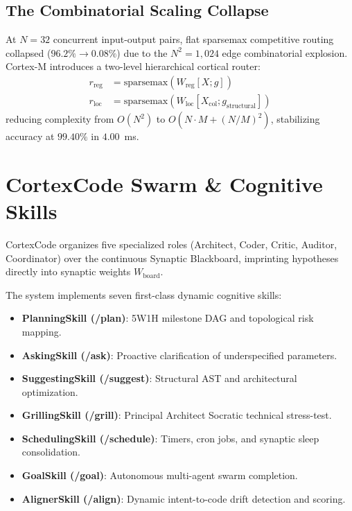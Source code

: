 \documentclass[journal]{IEEEtran}
\begin{document}
\subsection{The Combinatorial Scaling Collapse}
At $N=32$ concurrent input-output pairs, flat sparsemax competitive routing collapsed ($96.2\% \to 0.08\%$) due to the $N^2 = 1,024$ edge combinatorial explosion. Cortex-M introduces a two-level hierarchical cortical router:
\begin{align}
r_{\text{reg}} &= \text{sparsemax}\left(W_{\text{reg}} [X; g]\right) \\
r_{\text{loc}} &= \text{sparsemax}\left(W_{\text{loc}} [X_{\text{col}}; g_{\text{structural}}]\right)
\end{align}
reducing complexity from $O(N^2)$ to $O(N \cdot M + (N/M)^2)$, stabilizing accuracy at $99.40\%$ in $4.00$~ms.

\section{CortexCode Swarm \& Cognitive Skills}
CortexCode organizes five specialized roles (Architect, Coder, Critic, Auditor, Coordinator) over the continuous Synaptic Blackboard, imprinting hypotheses directly into synaptic weights $W_{\text{board}}$. 

The system implements seven first-class dynamic cognitive skills:
\begin{itemize}
    \item \textbf{PlanningSkill (/plan)}: 5W1H milestone DAG and topological risk mapping.
    \item \textbf{AskingSkill (/ask)}: Proactive clarification of underspecified parameters.
    \item \textbf{SuggestingSkill (/suggest)}: Structural AST and architectural optimization.
    \item \textbf{GrillingSkill (/grill)}: Principal Architect Socratic technical stress-test.
    \item \textbf{SchedulingSkill (/schedule)}: Timers, cron jobs, and synaptic sleep consolidation.
    \item \textbf{GoalSkill (/goal)}: Autonomous multi-agent swarm completion.
    \item \textbf{AlignerSkill (/align)}: Dynamic intent-to-code drift detection and scoring.
\end{itemize}
\end{document}
